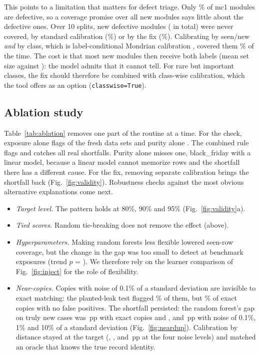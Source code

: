 This points to a limitation that matters for defect triage. Only \NMcOneDefShare{}\% of mc1 modules are defective, so a coverage promise over all new modules says little about the defective ones. Over 10 splits, new defective modules (\NCcFixDefN{} in total) were never covered, by standard calibration (\NCcStdDefCov{}\%) or by the fix (\NCcFixDefCov{}\%). Calibrating by seen/new \emph{and} by class, which is label-conditional Mondrian calibration \citep{lofstrom2015,vovk2022}, covered them \NCcClsDefCov{}\% of the time. The cost is that most new modules then receive both labels (mean set size \NCcClsOkSize{} against \NCcFixOkSize{}): the model admits that it cannot tell. For rare but important classes, the fix should therefore be combined with class-wise calibration, which the tool offers as an option (\texttt{classwise=True}).

\subsection{Ablation study}\label{sec:res-ablation}
Table~\ref{tab:ablation} removes one part of the routine at a time. For the check, exposure alone flags \NAblExpoFlag{} of the \NAblNds{} fresh data sets and purity alone \NAblPureFlag{}. The combined rule flags \NAblCombFlag{} and catches all \NAblNpos{} real shortfalls. Purity alone misses one, black\_friday with a linear model, because a linear model cannot memorize rows and the shortfall there has a different cause. For the fix, removing separate calibration brings the shortfall back (Fig.~\ref{fig:validity}). Robustness checks against the most obvious alternative explanations come next.
\begin{itemize}
\item \emph{Target level.} The pattern holds at 80\%, 90\% and 95\% (Fig.~\ref{fig:validity}a).
\item \emph{Tied scores.} Random tie-breaking does not remove the effect (above).
\item \emph{Hyperparameters.} Making random forests less flexible lowered seen-row coverage, but the change in the gap was too small to detect at benchmark exposures (trend $p$ = \NCapClassificationRfP{}). We therefore rely on the learner comparison of Fig.~\ref{fig:inject} for the role of flexibility.
\item \emph{Near-copies.} Copies with noise of 0.1\% of a standard deviation are invisible to exact matching: the planted-leak test flagged \NLeakJitterRecall{}\% of them, but \NLeakRecall{}\% of \NLeakPlanted{} exact copies with no false positives. The shortfall persisted: the random forest's gap on truly new cases was \NNdClaZeropZeroSCP{}\,pp with exact copies and \NNdClaZeropZeroZeroOneSCP{}, \NNdClaZeropZeroOneSCP{} and \NNdClaZeropOneSCP{}\,pp with noise of 0.1\%, 1\% and 10\% of a standard deviation (Fig.~\ref{fig:neardup}). Calibration by distance stayed at the target (\NNdClaZeropZeroDCP{}, \NNdClaZeropZeroZeroOneDCP{}, \NNdClaZeropZeroOneDCP{} and \NNdClaZeropOneDCP{}\,pp at the four noise levels) and matched an oracle that knows the true record identity.
\end{itemize}

